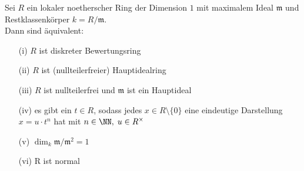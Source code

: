 \begin{Satz} 
\label{Satz12}
Sei $R$ ein lokaler noetherscher Ring der Dimension $1$ mit maximalem Ideal
$\mathfrak{m}$ und Restklassenkörper $k = R/\mathfrak{m}$.\\
Dann sind äquivalent:
\begin{enumerate}
  \item[(i)] $R$ ist diskreter Bewertungsring
  \item[(ii)] $R$ ist (nullteilerfreier) Hauptidealring
  \item[(iii)] $R$ ist nullteilerfrei und $\mathfrak{m}$ ist ein Hauptideal
  \item[(iv)] es gibt ein $t \in R$, sodass jedes $x \in R \setminus \{0\}$ eine
  eindeutige Darstellung $x=u \cdot t^n$ hat mit $n \in \NN, \; u \in
  R^{\times}$
  \item[(v)] $\dim_k \mathfrak{m}/\mathfrak{m}^2 = 1$
  \item[(vi)] R ist normal
\end{enumerate}
\end{Satz}

